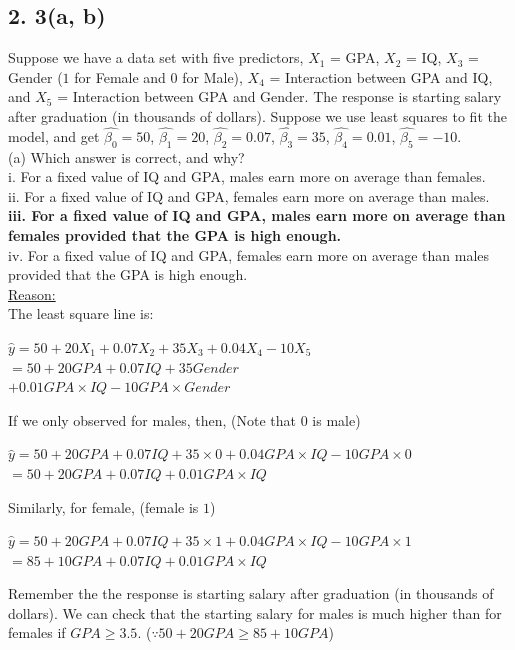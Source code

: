 \documentclass{article}
\begin{document}
\subsection*{2. 3(a, b)}
Suppose we have a data set with five predictors, $X_1$ = GPA, $X_2$ = IQ,
$X_3$ = Gender ($1$ for Female and $0$ for Male), $X_4$ = Interaction between
GPA and IQ, and $X_5$ = Interaction between GPA and Gender. The
response is starting salary after graduation (in thousands of dollars).
Suppose we use least squares to fit the model, and get $\hat{\beta_0} = 50$, $\hat{\beta_1} = 20$, $\hat{\beta_2} = 0.07$, $\hat{\beta_3} = 35$, $\hat{\beta_4} = 0.01$, $\hat{\beta_5} = −10$. \\
(a) Which answer is correct, and why? \\
\indent i. For a fixed value of IQ and GPA, males earn more on average than females. \\
\indent ii. For a fixed value of IQ and GPA, females earn more on average than males. \\
\indent \textbf{iii. For a fixed value of IQ and GPA, males earn more on average than females provided that the GPA is high enough.} \\
\indent iv. For a fixed value of IQ and GPA, females earn more on average than males provided that the GPA is high enough. \\
\underline{Reason:} \\
The least square line is: 
\begin{center}
$\hat{y} = 50 + 20X_1 + 0.07X_2 + 35X_3 + 0.04X_4 -10X_5$ \\
$= 50 + 20GPA + 0.07IQ + 35Gender$ \\
$+ 0.01GPA\times IQ - 10GPA\times Gender$
\end{center}
If we only observed for males, then, (Note that $0$ is male) 
\begin{center}
$\hat{y} = 50 + 20GPA + 0.07IQ + 35\times 0 + 0.04GPA \times IQ -10GPA \times 0$ \\
$= 50 + 20GPA + 0.07IQ + 0.01GPA\times IQ$
\end{center}
Similarly, for female, (female is $1$)
\begin{center}
$\hat{y} = 50 + 20GPA + 0.07IQ + 35\times 1 + 0.04GPA \times IQ -10GPA \times 1$ \\
$= 85 + 10GPA + 0.07IQ + 0.01GPA\times IQ$
\end{center}
Remember the the response is starting salary after graduation (in thousands of dollars). We can check that the starting salary for males is much higher than for females if $GPA \geq 3.5$. ($\because 50 + 20GPA \geq 85 + 10GPA$) 
\end{document}
